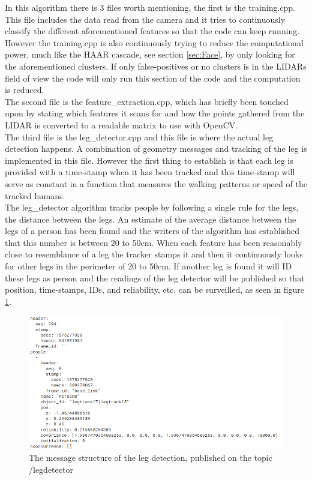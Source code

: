 In this algorithm there is 3 files worth mentioning, the first is the training.cpp. This file includes the data read from the camera and it tries to continuously classify the different aforementioned features so that the code can keep running. However the training.cpp is also continuously trying to reduce the computational power, much like the HAAR cascade, see section \ref{sec:Face}, by only looking for the aforementioned clusters. If only false-positives or no clusters is in the LIDARs field of view the code will only run this section of the code and the computation is reduced.\\
The second file is the feature\_extraction.cpp, which has briefly been touched upon by stating which features it scans for and how the points gathered from the LIDAR is converted to a readable matrix to use with OpenCV.\\
The third file is the leg\_detector.cpp and this file is where the actual leg detection happens. A combination of geometry messages and tracking of the leg is implemented in this file. However the first thing to establish is that each leg is provided with a time-stamp when it has been tracked and this time-stamp will serve as constant in a function that measures the walking patterns or speed of the tracked humans.\\
The leg\_detector algorithm tracks people by following a single rule for the legs, the distance between the legs. An estimate of the average distance between the legs of a person has been found and the writers of the algorithm has established that this number is between 20 to 50cm. When each feature has been reasonably close to resemblance of a leg the tracker stamps it and then it continuously looks for other legs in the perimeter of 20 to 50cm. If another leg is found it will ID these legs as person and the readings of the leg detector will be published so that position, time-stamps, IDs, and reliability, etc. can be surveilled, as seen in figure \ref{fig:reliability}.

\begin{figure}[H]
    \centering
    \includegraphics[width=\textwidth]{figures/leg_detector_msg.png}
    \caption{The message structure of the leg detection, published on the topic /legdetector}
    \label{fig:reliability}
\end{figure}

